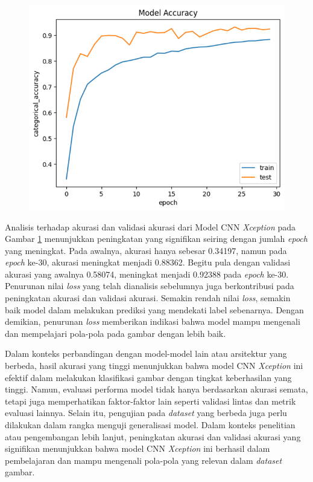 \begin{figure}[!hbt]
	\centering
	\includegraphics[width=0.7\linewidth]{gambar/bener/Accuracy_ModelXception.png}
	\label{fig:akurasiModelCNNXception}
\end{figure}

Analisis terhadap akurasi dan validasi akurasi dari Model CNN \textit{Xception} pada Gambar \ref{fig:akurasiModelCNNXception} menunjukkan peningkatan yang signifikan seiring dengan jumlah \textit{epoch} yang meningkat. Pada awalnya, akurasi hanya sebesar 0.34197, namun pada \textit{epoch} ke-30, akurasi meningkat menjadi 0.88362. Begitu pula dengan validasi akurasi yang awalnya 0.58074, meningkat menjadi 0.92388 pada \textit{epoch} ke-30.
Penurunan nilai \textit{loss} yang telah dianalisis sebelumnya juga berkontribusi pada peningkatan akurasi dan validasi akurasi. Semakin rendah nilai \textit{loss}, semakin baik model dalam melakukan prediksi yang mendekati label sebenarnya. Dengan demikian, penurunan \textit{loss} memberikan indikasi bahwa model mampu mengenali dan mempelajari pola-pola pada gambar dengan lebih baik.

Dalam konteks perbandingan dengan model-model lain atau arsitektur yang berbeda, hasil akurasi yang tinggi menunjukkan bahwa model CNN \textit{Xception} ini efektif dalam melakukan klasifikasi gambar dengan tingkat keberhasilan yang tinggi. Namun, evaluasi performa model tidak hanya berdasarkan akurasi semata, tetapi juga memperhatikan faktor-faktor lain seperti validasi lintas dan metrik evaluasi lainnya. Selain itu, pengujian pada \textit{dataset} yang berbeda juga perlu dilakukan dalam rangka menguji generalisasi model. Dalam konteks penelitian atau pengembangan lebih lanjut, peningkatan akurasi dan validasi akurasi yang signifikan menunjukkan bahwa model CNN \textit{Xception} ini berhasil dalam pembelajaran dan mampu mengenali pola-pola yang relevan dalam \textit{dataset} gambar. 

